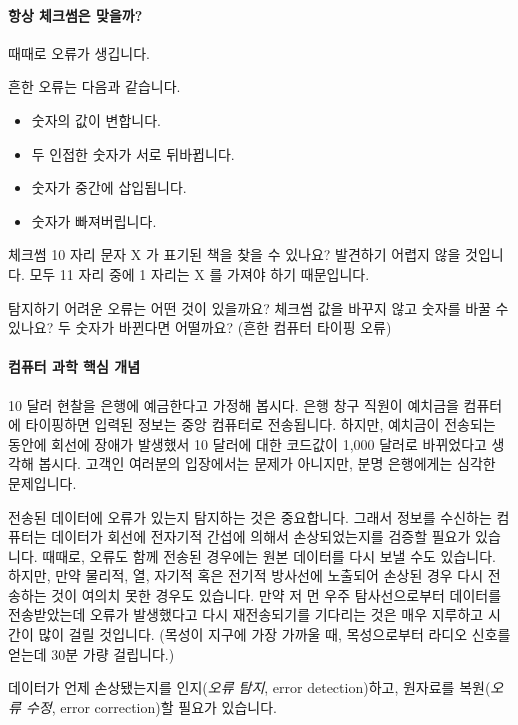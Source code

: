 \documentclass[]{article}
\begin{document}
\mbox{}\paragraph{항상 체크썸은 맞을까?}\label{section-70}

때때로 오류가 생깁니다.

흔한 오류는 다음과 같습니다.

\begin{itemize}
\itemsep1pt\parskip0pt
\item
  숫자의 값이 변합니다.
\item
  두 인접한 숫자가 서로 뒤바뀝니다.
\item
  숫자가 중간에 삽입됩니다.
\item
  숫자가 빠져버립니다.
\end{itemize}

체크썸 10 자리 문자 X 가 표기된 책을 찾을 수 있나요? 발견하기 어렵지
않을 것입니다. 모두 11 자리 중에 1 자리는 X 를 가져야 하기 때문입니다.

탐지하기 어려운 오류는 어떤 것이 있을까요? 체크썸 값을 바꾸지 않고
숫자를 바꿀 수 있나요? 두 숫자가 바뀐다면 어떨까요? (흔한 컴퓨터 타이핑
오류)

\mbox{}\paragraph{컴퓨터 과학 핵심 개념}\label{section-71}

10 달러 현찰을 은행에 예금한다고 가정해 봅시다. 은행 창구 직원이
예치금을 컴퓨터에 타이핑하면 입력된 정보는 중앙 컴퓨터로 전송됩니다.
하지만, 예치금이 전송되는 동안에 회선에 장애가 발생했서 10 달러에 대한
코드값이 1,000 달러로 바뀌었다고 생각해 봅시다. 고객인 여러분의
입장에서는 문제가 아니지만, 분명 은행에게는 심각한 문제입니다.

전송된 데이터에 오류가 있는지 탐지하는 것은 중요합니다. 그래서 정보를
수신하는 컴퓨터는 데이터가 회선에 전자기적 간섭에 의해서 손상되었는지를
검증할 필요가 있습니다. 때때로, 오류도 함께 전송된 경우에는 원본
데이터를 다시 보낼 수도 있습니다. 하지만, 만약 물리적, 열, 자기적 혹은
전기적 방사선에 노출되어 손상된 경우 다시 전송하는 것이 여의치 못한
경우도 있습니다. 만약 저 먼 우주 탐사선으로부터 데이터를 전송받았는데
오류가 발생했다고 다시 재전송되기를 기다리는 것은 매우 지루하고 시간이
많이 걸릴 것입니다. (목성이 지구에 가장 가까울 때, 목성으로부터 라디오
신호를 얻는데 30분 가량 걸립니다.)

데이터가 언제 손상됐는지를 인지(\emph{오류 탐지}, error detection)하고,
원자료를 복원(\emph{오류 수정}, error correction)할 필요가 있습니다.
\end{document}
